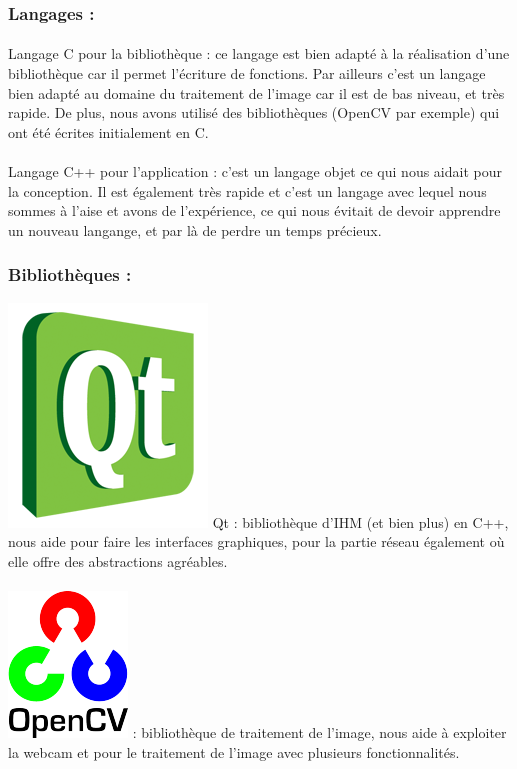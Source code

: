 \documentclass{report}
\begin{document}
			\subsubsection{Langages :}
			\paragraph{} Langage C pour la bibliothèque : ce langage est bien adapté à la réalisation d'une bibliothèque car il permet l'écriture de fonctions. Par ailleurs c'est un langage bien adapté au domaine du traitement de l'image car il est de bas niveau, et très rapide. De plus, nous avons utilisé des bibliothèques (OpenCV par exemple) qui ont été écrites initialement en C.
			\paragraph{} Langage C++ pour l'application : c'est un langage objet ce qui nous aidait pour la conception. Il est également très rapide et c'est un langage avec lequel nous sommes à l'aise et avons de l'expérience, ce qui nous évitait de devoir apprendre un nouveau langange, et par là de perdre un temps précieux.\\
			
			\subsubsection{Bibliothèques :}
			\includegraphics[scale=0.15]{../logos/qt_logo.png}
			Qt : bibliothèque d'IHM (et bien plus) en C++, nous aide pour faire les interfaces graphiques, pour la partie réseau également où elle offre des abstractions agréables. \\
			\paragraph{}
			\includegraphics[scale=1]{../logos/OpenCV_Logo.png}
			: bibliothèque de traitement de l'image, nous aide à exploiter la webcam et pour le traitement de l'image avec plusieurs fonctionnalités. \\
		
\end{document}
